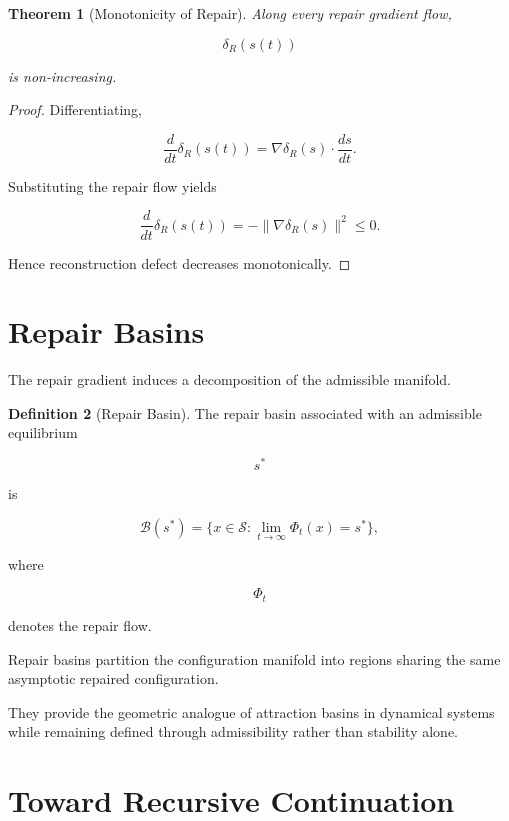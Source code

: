 \documentclass[11pt]{book}
\numberwithin{equation}{chapter}
\theoremstyle{definition}
\newtheorem{definition}{Definition}[chapter]
\theoremstyle{plain}
\newtheorem{theorem}[definition]{Theorem}
\begin{document}
\begin{theorem}[Monotonicity of Repair]

Along every repair gradient flow,

\[
\delta_R(s(t))
\]

is non-increasing.

\end{theorem}

\begin{proof}

Differentiating,

\[
\frac{d}{dt}
\delta_R(s(t))
=
\nabla\delta_R(s)
\cdot
\frac{ds}{dt}.
\]

Substituting the repair flow yields

\[
\frac{d}{dt}
\delta_R(s(t))
=
-
\|\nabla\delta_R(s)\|^2
\le
0.
\]

Hence reconstruction defect decreases monotonically.

\end{proof}

\section{Repair Basins}

The repair gradient induces a decomposition of the admissible
manifold.

\begin{definition}[Repair Basin]

The repair basin associated with an admissible equilibrium

\[
s^*
\]

is

\[
\mathcal B(s^*)
=
\{
x\in\mathcal S
:
\lim_{t\rightarrow\infty}
\Phi_t(x)
=
s^*
\},
\]

where

\[
\Phi_t
\]

denotes the repair flow.

\end{definition}

Repair basins partition the configuration manifold into regions
sharing the same asymptotic repaired configuration.

They provide the geometric analogue of attraction basins in
dynamical systems while remaining defined through admissibility
rather than stability alone.

\section{Toward Recursive Continuation}
\end{document}
